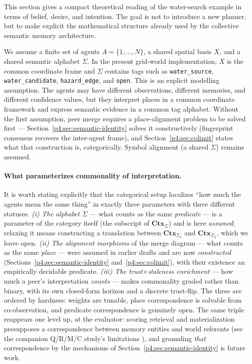 \documentclass{article}
\begin{document}
This section gives a compact theoretical reading of the water-search
example in terms of belief, desire, and intention. The goal is not to
introduce a new planner, but to make explicit the mathematical
structure already used by the collective semantic memory architecture.

We assume a finite set of agents $A=\{1,\ldots,N\}$, a shared spatial
basis $X$, and a shared semantic alphabet $\Sigma$. In the present
grid-world implementation, $X$ is the common coordinate frame and
$\Sigma$ contains tags such as \texttt{water\_source},
\texttt{water\_candidate}, \texttt{hazard\_edge}, and \texttt{open}.
This is an explicit modelling assumption. The agents may have different
observations, different memories, and different confidence values, but
they interpret places in a common coordinate framework and express
semantic evidence in a common tag alphabet. Without the first
assumption, peer merge requires a place-alignment problem to be solved
first --- Section~\ref{p4:sec:semantic-identity} solves it constructively
(fingerprint consensus recovers the inter-agent frame), and
Section~\ref{p4:sec:colimit} states what that construction is,
categorically. Symbol alignment (a shared $\Sigma$) remains assumed.

\paragraph{What parameterizes commonality of interpretation.} It is
worth stating explicitly that the categorical setup localizes ``how
much the agents mean the same thing'' in exactly three parameters with
three different statuses. \emph{(i) The alphabet $\Sigma$} --- what
counts as the same \emph{predicate} --- is a parameter of the category
itself (the subscript of $\mathbf{Ctx}_\Sigma$) and is here
\emph{assumed}; relaxing it means constructing a translation between
$\mathbf{Ctx}_{\Sigma_1}$ and $\mathbf{Ctx}_{\Sigma_2}$, which we leave
open. \emph{(ii) The alignment morphisms} of the merge diagram ---
what counts as the same \emph{place} --- were assumed in earlier
drafts and are now \emph{constructed}
(Sections~\ref{p4:sec:semantic-identity} and~\ref{p4:sec:colimit}), with
their existence an empirically decidable predicate. \emph{(iii) The
trust$\times$staleness enrichment} --- how much a peer's
interpretation \emph{counts} --- makes commonality graded rather than
binary, with its own closed-form horizon and a discrete trust-flip.
The three are ordered by hardness: weights are tunable, place
correspondence is solvable from co-observation, and predicate
correspondence is genuinely open. The same triple reappears one level
up, at the evaluator: scoring retrieval and materialization
presupposes a correspondence between memory entities and world
referents (see the companion Q/R/M/C study's limitations \citep{songlines1}), and
grounding \emph{that} correspondence by the mechanisms of
Section~\ref{p4:sec:semantic-identity} is future work.
\end{document}
